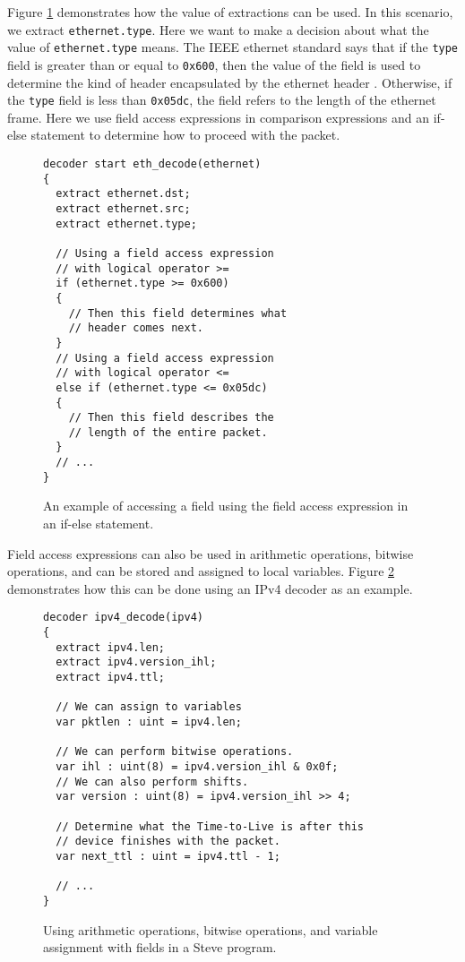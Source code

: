 Figure \ref{fg:access_ex} demonstrates how the value of extractions can be used. In this scenario, we extract \texttt{ethernet.type}. Here we want to make a decision about what the value of \texttt{ethernet.type} means. The IEEE ethernet standard says that if the \texttt{type} field is greater than or equal to \texttt{0x600}, then the value of the field is used to determine the kind of header encapsulated by the ethernet header \cite{eth_std}. Otherwise, if the \texttt{type} field is less than \texttt{0x05dc}, the field refers to the length of the ethernet frame. Here we use field access expressions in comparison expressions and an if-else statement to determine how to proceed with the packet. 

\begin{figure}[ht]
\begin{lstlisting}
decoder start eth_decode(ethernet)
{
  extract ethernet.dst;
  extract ethernet.src;
  extract ethernet.type;
  
  // Using a field access expression 
  // with logical operator >=
  if (ethernet.type >= 0x600)
  {
    // Then this field determines what
    // header comes next.
  }
  // Using a field access expression 
  // with logical operator <=
  else if (ethernet.type <= 0x05dc)
  {
    // Then this field describes the
    // length of the entire packet.
  }
  // ...
}
\end{lstlisting}
\caption{An example of accessing a field using the field access expression in an if-else statement.}
\label{fg:access_ex}
\end{figure}

Field access expressions can also be used in arithmetic operations, bitwise operations, and can be stored and assigned to local variables. Figure \ref{fg:assign_arith_ex} demonstrates how this can be done using an IPv4 decoder as an example.

\begin{figure}[ht]
\begin{lstlisting}
decoder ipv4_decode(ipv4)
{
  extract ipv4.len;
  extract ipv4.version_ihl;
  extract ipv4.ttl;
  
  // We can assign to variables
  var pktlen : uint = ipv4.len;
  
  // We can perform bitwise operations.
  var ihl : uint(8) = ipv4.version_ihl & 0x0f;
  // We can also perform shifts.
  var version : uint(8) = ipv4.version_ihl >> 4;
  
  // Determine what the Time-to-Live is after this
  // device finishes with the packet.
  var next_ttl : uint = ipv4.ttl - 1;
  
  // ...
}
\end{lstlisting}
\caption{Using arithmetic operations, bitwise operations, and variable assignment with fields in a Steve program.}
\label{fg:assign_arith_ex}
\end{figure}

